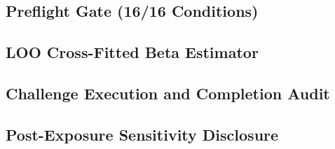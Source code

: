 \subsection{Preflight Gate (16/16 Conditions)}

\subsection{LOO Cross-Fitted Beta Estimator}


\subsection{Challenge Execution and Completion Audit}

\subsection{Post-Exposure Sensitivity Disclosure}

